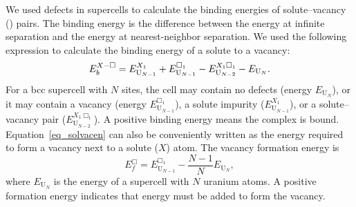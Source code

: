 We used defects in supercells to calculate the binding energies
of solute--vacancy () pairs. The binding energy is the
difference between the energy at infinite separation and the energy at
nearest-neighbor separation. We used the following expression to calculate the
binding energy of a solute to a vacancy:
\begin{equation}
  E_b^{\ce{$X$-\Box}}
    = E^{X_1}_{\mathrm{U}_{N-1}} + E^{\Box_1}_{\mathrm{U}_{N-1}}
    - E^{X_1\Box_1}_{\mathrm{U}_{N-2}} - E_{\mathrm{U}_N}.
  \label{eq_solvacen}
\end{equation}
For a bcc supercell with $N$ sites, the cell may contain no defects (energy
$E_{\mathrm{U}_N}$), or it may contain a vacancy (energy
$E^{\Box_1}_{\mathrm{U}_{N-1}}$), a solute
impurity ($E^{X_1}_{\mathrm{U}_{N-1}}$), or a solute--vacancy pair
($E^{X_1\Box_1}_{\mathrm{U}_{N-2}}$).
A positive binding energy means the complex is bound.
Equation~\eqref{eq_solvacen} can
also be conveniently written as the energy required to form a vacancy next to
a solute ($X$) atom. The vacancy formation energy is 
\begin{equation}
    E^{\Box}_f = E^{\Box_1}_{\mathrm{U}_{N-1}}
        - \frac{N-1}{N} E_{\mathrm{U}_N},
  \label{eq_vacen}
\end{equation}
where $E_{\mathrm{U}_N}$ is the energy of a supercell with $N$ uranium atoms.
A positive formation energy indicates that energy must be added to form the
vacancy.

